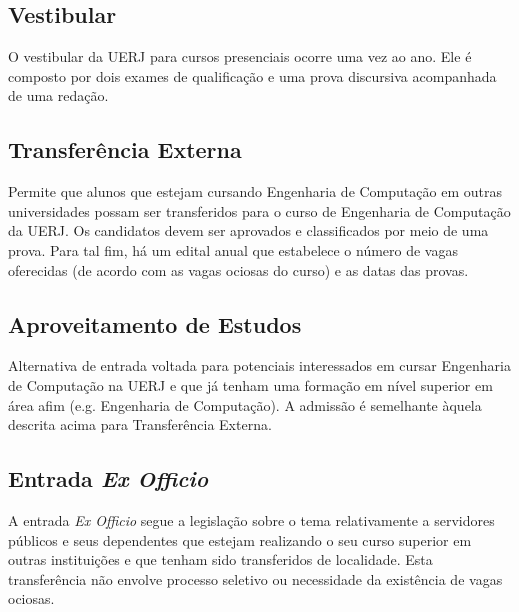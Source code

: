 \subsection{Vestibular}
O vestibular da UERJ para cursos presenciais ocorre uma vez ao ano. Ele é composto por dois exames de qualificação e uma prova discursiva acompanhada de uma redação.

\subsection{Transferência Externa}
Permite que alunos que estejam cursando Engenharia de Computação em outras universidades possam ser transferidos para o curso de Engenharia de Computação da UERJ. Os candidatos devem ser aprovados e classificados por meio de uma prova. Para tal fim, há um edital anual que estabelece o número de vagas oferecidas (de acordo com as vagas ociosas do curso) e as datas das provas.

\subsection{Aproveitamento de Estudos}
Alternativa de entrada voltada para potenciais interessados em cursar Engenharia de Computação na UERJ e que já tenham uma formação em nível superior em área afim (e.g. Engenharia de Computação). A admissão é semelhante àquela descrita acima para Transferência Externa.

\subsection{Entrada \textit{Ex Officio}}
A entrada \textit{Ex Officio} segue a legislação sobre o tema relativamente a servidores públicos e seus dependentes que estejam realizando o seu curso superior em outras instituições e que tenham sido transferidos de localidade. Esta transferência não envolve processo seletivo ou necessidade da existência de vagas ociosas.

